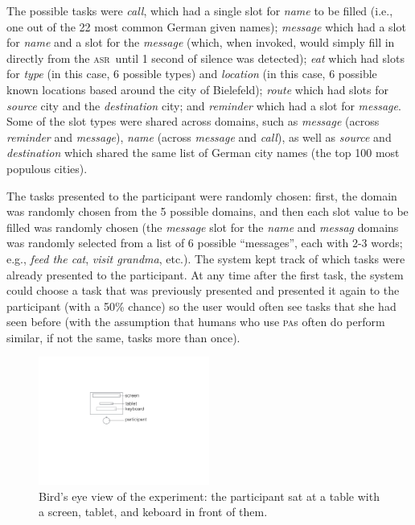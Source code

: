 \documentclass[11pt]{article}
\newcommand{\asr}[0]{\textsc{asr}}
\newcommand{\pa}[0]{\textsc{pa}}
\begin{document}
The possible tasks were \emph{call}, which had a single slot for \emph{name} to be filled (i.e., one out of the 22 most common German given names); \emph{message} which had a slot for \emph{name} and a slot for the \emph{message} (which, when invoked, would simply fill in directly from the \asr\ until 1 second of silence was detected); \emph{eat} which had slots for \emph{type} (in this case, 6 possible types) and \emph{location} (in this case, 6 possible known locations based around the city of Bielefeld); \emph{route} which had slots for \emph{source} city and the \emph{destination} city; and \emph{reminder} which had a slot for \emph{message}. Some of the slot types were shared across domains, such as \emph{message} (across \emph{reminder} and \emph{message}), \emph{name} (across \emph{message} and \emph{call}), as well as \emph{source} and \emph{destination} which shared the same list of German city names (the top 100 most populous cities). 

The tasks presented to the participant were randomly chosen: first, the domain was randomly chosen from the 5 possible domains, and then each slot value to be filled was randomly chosen (the \emph{message} slot for the \emph{name} and \emph{messag} domains was randomly selected from a list of 6 possible ``messages'', each with 2-3 words; e.g., \emph{feed the cat}, \emph{visit grandma}, etc.). The system kept track of which tasks were already presented to the participant. At any time after the first task, the system could choose a task that was previously presented and presented it again to the participant (with a 50\% chance) so the user would often see tasks that she had seen before (with the assumption that humans who use \pa s often do perform similar, if not the same, tasks more than once). 

\begin{figure}[ht]
  \centering
      \includegraphics[width=0.5\textwidth]{figures/dataview.pdf}	
      \caption{Bird's eye view of the experiment: the participant sat at a table with a screen, tablet, and keboard in front of them. \label{fig:dataview}}
\end{figure}
\end{document}
